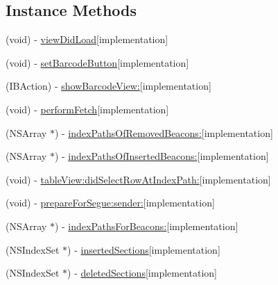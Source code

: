 \subsection*{Instance Methods}
\begin{DoxyCompactItemize}
\item 
(void) -\/ \hyperlink{interface_beacon_view_controller_a142aa58260d73434857ed22ce968affb}{view\+Did\+Load}{\ttfamily  \mbox{[}implementation\mbox{]}}
\item 
(void) -\/ \hyperlink{interface_beacon_view_controller_ad1658edbb4ad1b0c8caa494b91dac692}{set\+Barcode\+Button}{\ttfamily  \mbox{[}implementation\mbox{]}}
\item 
(I\+B\+Action) -\/ \hyperlink{interface_beacon_view_controller_a914fc79a13ba8811954362235b79b48b}{show\+Barcode\+View\+:}{\ttfamily  \mbox{[}implementation\mbox{]}}
\item 
(void) -\/ \hyperlink{interface_beacon_view_controller_a05488f1a929e7ba833b3b07ed762a504}{perform\+Fetch}{\ttfamily  \mbox{[}implementation\mbox{]}}
\item 
(N\+S\+Array $\ast$) -\/ \hyperlink{interface_beacon_view_controller_a115dc7edd50b975c3b002e61980a7b03}{index\+Paths\+Of\+Removed\+Beacons\+:}{\ttfamily  \mbox{[}implementation\mbox{]}}
\item 
(N\+S\+Array $\ast$) -\/ \hyperlink{interface_beacon_view_controller_aff5cc41c1f9a128565b7da7f50c8829b}{index\+Paths\+Of\+Inserted\+Beacons\+:}{\ttfamily  \mbox{[}implementation\mbox{]}}
\item 
(void) -\/ \hyperlink{interface_beacon_view_controller_a406c31b06dce9a63ec9c675fca68a0f0}{table\+View\+:did\+Select\+Row\+At\+Index\+Path\+:}{\ttfamily  \mbox{[}implementation\mbox{]}}
\item 
(void) -\/ \hyperlink{interface_beacon_view_controller_a8b755cbe9132ca1253576fd7d9aacc9d}{prepare\+For\+Segue\+:sender\+:}{\ttfamily  \mbox{[}implementation\mbox{]}}
\item 
(N\+S\+Array $\ast$) -\/ \hyperlink{interface_beacon_view_controller_a9135cf5cf116be5ea0bed151722bbfe5}{index\+Paths\+For\+Beacons\+:}{\ttfamily  \mbox{[}implementation\mbox{]}}
\item 
(N\+S\+Index\+Set $\ast$) -\/ \hyperlink{interface_beacon_view_controller_a753023f6aac8bbaf4815c54016c393a0}{inserted\+Sections}{\ttfamily  \mbox{[}implementation\mbox{]}}
\item 
(N\+S\+Index\+Set $\ast$) -\/ \hyperlink{interface_beacon_view_controller_ad117eea117a169fb7a238df38355cdc1}{deleted\+Sections}{\ttfamily  \mbox{[}implementation\mbox{]}}

\end{DoxyCompactItemize}
